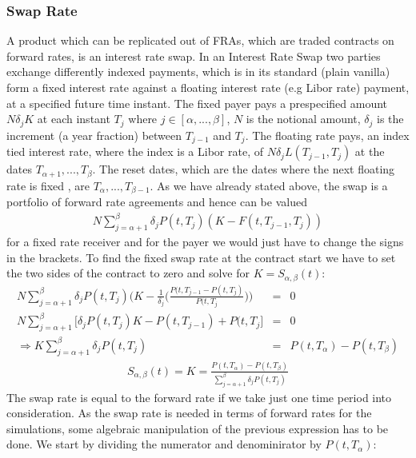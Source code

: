 \documentclass[11pt]{article}
\numberwithin{equation}{subsection}
\begin{document}
\subsubsection{Swap Rate}
A product which can be replicated out of FRAs, which are traded contracts on forward rates, is an interest rate swap. In an Interest Rate Swap two parties exchange differently indexed payments, which is in its standard (plain vanilla) form a fixed interest rate against a floating interest rate (e.g Libor rate) payment, at a specified future time instant. The fixed payer pays a prespecified amount \(N\delta_{j}K\) at each instant \(T_j\) where \(j \in [\alpha,...,\beta]\), \(N\) is the notional amount, \(\delta_j\) is the increment (a year fraction) between \(T_{j-1}\) and \(T_j\). The floating rate pays, an index tied interest rate, where the index is a Libor rate, of \(N\delta_{j}L(T_{j-1}, T_j)\) at the dates \(T_{\alpha+1},...,T_{\beta}\). The reset dates, which are the dates where the next floating rate is fixed , are \(T_{\alpha},...,T_{\beta-1}\). As we have already stated above, the swap is a portfolio of forward rate agreements and hence can be valued
\begin{eqnarray*}
N \sum_{j=\alpha+1}^{\beta} \delta_{j} P(t, T_j) (K - F(t, T_{j-1}, T_j))
\end{eqnarray*}
for a fixed rate receiver and for the payer we would just have to change the signs in the brackets.
To find the fixed swap rate at the contract start we have to set the two sides of the contract to zero and solve for \(K=S_{\alpha, \beta}(t)\):
\begin{eqnarray*}
	N \sum_{j=\alpha+1}^{\beta} \delta_{j} P(t, T_j) \bigg(K - \frac{1}{\delta_j} \bigg(\frac{P(t, T_{j-1}-P(t, T_{j})}{P(t, T_{j}}\bigg) \bigg) &=& 0 \\
	N \sum_{j=\alpha+1}^{\beta} \bigg[\delta_{j} P(t, T_j) K - P(t, T_{j-1}) + P(t, T_{j} \bigg] &=& 0 \\
	\Rightarrow K \sum_{j=\alpha+1}^{\beta} \delta_{j} P(t, T_j) &=& P(t, T_{\alpha}) - P(t, T_{\beta})
\end{eqnarray*}
\begin{eqnarray}
S_{\alpha, \beta}(t) = K = \frac{P(t, T_{\alpha}) - P(t, T_{\beta})}{\sum_{j=\alpha+1}^{\beta} \delta_{j} P(t, T_j)}
\end{eqnarray}
The swap rate is equal to the forward rate if we take just one time period into consideration. As the swap rate is needed in terms of forward rates for the simulations, some algebraic manipulation of the previous expression has to be done. We start by dividing the numerator and denominirator by \(P(t, T_{\alpha})\):
\end{document}
